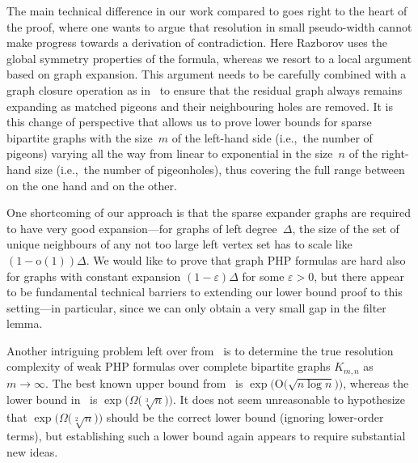 \documentclass{theoretics}
\newcommand{\Bigoh}[1]{\mathrm{O} \bigl( #1 \bigr)}
\newcommand{\littleoh}[1]{\mathrm{o} ( #1 )}
\newcommand{\Bigomega}[1]{\Omega \bigl( #1 \bigr)}
\newcommand{\ie}{i.e.,\ }
\newcommand{\GdegMax}{\Delta}
\newcommand{\gdegmax}{\GdegMax}
\newcommand{\pseudowidth}{pseudo-width\xspace}
\numberwithin{equation}{section}
\begin{document}
The main technical difference in our work compared to
\cite{Razborov04ResolutionLowerBoundsPM,Razborov03ResolutionLowerBoundsWFPHP} 
goes right to the heart of the proof, where one wants to argue that
resolution in small \pseudowidth cannot make progress towards a
derivation of contradiction. Here Razborov uses the global symmetry
properties of the formula, whereas we resort to a local argument based on
graph expansion. This argument needs to be carefully combined with a
graph closure operation as 
in~\cite{ABRW04Pseudorandom,AR03LowerBounds} to ensure that the
residual graph always remains expanding as matched pigeons and their
neighbouring holes are removed. It is this change of perspective that
allows us to prove lower bounds for sparse bipartite graphs
with the size~$m$ of the left-hand side (\ie the number of pigeons)
varying all the way from linear to exponential in the size~$n$ of the
right-hand size (\ie the number of pigeonholes),
thus covering the full range between
\cite{BW01ShortProofs} on the one hand and
\cite{Raz04Resolution,Razborov04ResolutionLowerBoundsPM,Razborov03ResolutionLowerBoundsWFPHP}
on the other.



One shortcoming of our approach is that the sparse expander graphs are
required to have very good expansion---for graphs of left
degree~$\gdegmax$, the size of the set of unique neighbours of any not
too large left vertex set has to scale like
$(1 - \littleoh{1})\gdegmax$.  We would like to prove that graph PHP
formulas are hard also for graphs with constant expansion
$(1 - \varepsilon)\gdegmax$ for some $\varepsilon > 0$, but there
appear to be fundamental technical barriers to extending our lower
bound proof to this setting---in particular, since we can only obtain
a very small gap in the filter lemma.

Another intriguing problem left over
from~\cite{Razborov04ResolutionLowerBoundsPM} 
is to determine the true resolution complexity of weak PHP formulas
over complete bipartite graphs
$K_{m,n}$ as $m \to \infty$.
The best known upper  bound from~\cite{BP97Weak}
is
$\exp \bigr( \Bigoh{\sqrt{n \log n}} \bigr)$,
whereas the lower bound 
in~\cite{Razborov04ResolutionLowerBoundsPM,Razborov03ResolutionLowerBoundsWFPHP}
is
$\exp \bigl( \Bigomega{\sqrt[3]{n}} \bigr)$.
It does not seem unreasonable to hypothesize that 
$\exp \bigl( \Bigomega{\sqrt[2]{n}} \bigr)$
should be the correct lower bound (ignoring lower-order terms), but
establishing such a lower bound again appears to require substantial
new ideas.
\end{document}
